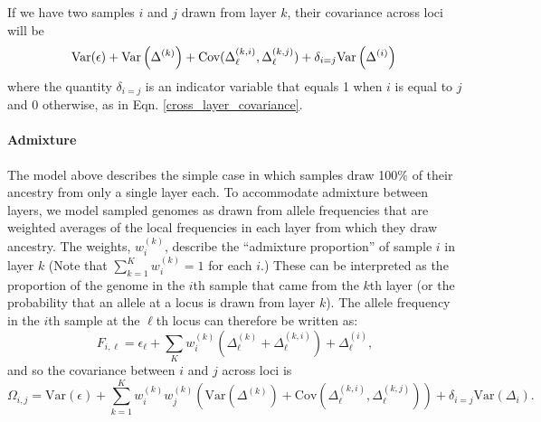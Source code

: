 \documentclass[12pt]{article}
\begin{document}
If we have two samples $i$ and $j$ drawn from layer $k$, 
their covariance across loci will be 
\begin{equation}
\text{Var}(\epsilon) +  \text{Var}\left( \Delta^{(k)} \right) +
\text{Cov}(\Delta^{(k,i)}_{\ell},\Delta^{(k,j)}_{\ell}) + \delta_{i=j} \text{Var}\left( \Delta^{(i)} \right)\ \\
\end{equation}
where the quantity $\delta_{i=j}$ is an indicator variable that equals 1 when $i$ is equal to $j$ and 0 otherwise, 
as in Eqn. \eqref{cross_layer_covariance}.

\paragraph{Admixture} 
The model above describes the simple case 
in which samples draw 100\% of their ancestry from only a single layer each. 
To accommodate admixture between layers, 
we model sampled genomes as drawn from
allele frequencies that are weighted averages of the local frequencies in each layer
from which they draw ancestry.
The weights, $w^{(k)}_{i}$, describe the
``admixture proportion'' of sample $i$ in layer $k$
(Note that $\sum_{k=1}^K w^{(k)}_{i} = 1$ for each $i$.)
These can be interpreted as the proportion of the genome in the $i$th
sample that came from the $k$th layer 
(or the probability that an allele at a locus is drawn from layer $k$).
The allele frequency in the $i$th sample at the $\ell$th locus can therefore be written as:
\begin{equation}
F_{i,\ell} = \epsilon_{\ell} + \sum\limits_{K} w^{(k)}_{i}\left( 
  \Delta^{(k)}_{\ell} + \Delta^{(k,i)}_{\ell}\right) + \Delta^{(i)}_{\ell}	 ,
\label{drift_terms_admix}
\end{equation}
and so the covariance between $i$ and $j$ across loci is
\begin{equation}
\Omega_{i,j} = \text{Var}(\epsilon) + \sum_{k=1}^K w^{(k)}_iw^{(k)}_j
\left(
  \text{Var}\left( \Delta^{(k)} \right) +
\text{Cov}(\Delta^{(k,i)}_{\ell},\Delta^{(k,j)}_{\ell}) 	\right) +
\delta_{i=j} \text{Var}(\Delta_i) .
\label{admixed_spatial_cov}
\end{equation}
\end{document}
